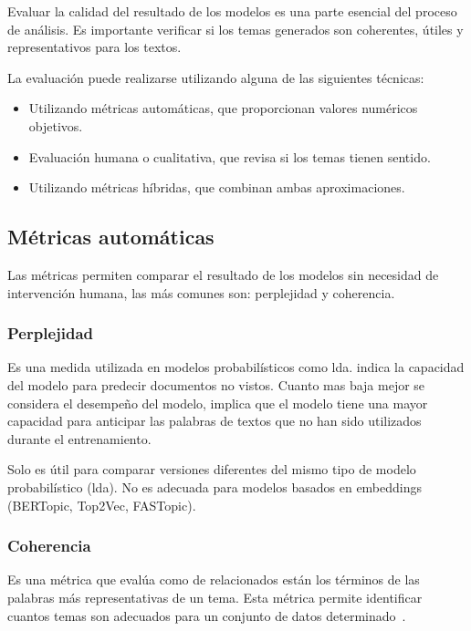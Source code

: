 Evaluar la calidad del resultado de los modelos es una parte esencial del
proceso de análisis. Es importante verificar si los temas generados son
coherentes, útiles y representativos para los textos.

La evaluación puede realizarse utilizando alguna de las siguientes técnicas:
\begin{itemize}
	\item Utilizando métricas automáticas, que proporcionan valores numéricos objetivos.
	\item Evaluación humana o cualitativa, que revisa si los temas tienen sentido.
	\item Utilizando métricas híbridas, que combinan ambas aproximaciones.
\end{itemize}

\subsection{Métricas automáticas}

Las métricas permiten comparar el resultado de los modelos sin necesidad de
intervención humana, las más comunes son: perplejidad y coherencia.

\subsubsection{Perplejidad}

Es una medida utilizada en modelos probabilísticos como \acrshort{lda}. indica
la capacidad del modelo para predecir documentos no vistos. Cuanto mas baja
mejor se considera el desempeño del modelo, implica que el modelo tiene una
mayor capacidad para anticipar las palabras de textos que no han sido
utilizados durante el entrenamiento.

Solo es útil para comparar versiones diferentes del mismo tipo de modelo
probabilístico (\acrshort{lda}). No es adecuada para modelos basados en
\gls{embeddings} (BERTopic, Top2Vec, FASTopic).

\subsubsection{Coherencia}

Es una métrica que evalúa como de relacionados están los términos de las
palabras más representativas de un tema. Esta métrica permite identificar
cuantos temas son adecuados para un conjunto de datos
determinado~\cite{pedroUnderstandingTopicCoherence2022}.

